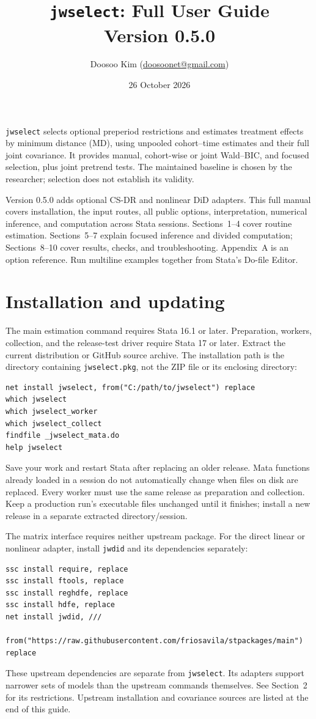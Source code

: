 \documentclass[11pt]{article}
\title{\texttt{jwselect}: Full User Guide\\\large Version 0.5.0}
\author{Doosoo Kim (\href{mailto:doosoonet@gmail.com}{doosoonet@gmail.com})}
\date{26 October 2026}
\newcommand{\cmd}[1]{\texttt{#1}}
\begin{document}
\maketitle\vspace{-1em}
\cmd{jwselect} selects optional preperiod restrictions and estimates treatment
 effects by minimum distance (MD), using unpooled cohort--time estimates and
 their full joint covariance. It provides manual, cohort-wise or joint Wald--BIC, and focused
 selection, plus joint pretrend tests. The maintained baseline is chosen by the researcher; selection
 does not establish its validity.

Version 0.5.0 adds optional CS-DR and nonlinear DiD adapters.
This full manual covers installation, the input routes, all public
 options, interpretation, numerical inference, and computation across Stata
 sessions. Sections~1--4 cover routine estimation. Sections~5--7 explain focused
 inference and divided computation; Sections~8--10 cover results, checks, and
 troubleshooting. Appendix~A is an option reference. Run multiline examples
 together from Stata's Do-file Editor.

\tableofcontents
\clearpage
\section{Installation and updating}
The main estimation command requires Stata 16.1 or later. Preparation,
workers, collection, and the release-test driver require Stata 17 or later.
Extract the current distribution or GitHub source archive. The installation
path is the directory containing \cmd{jwselect.pkg}, not the ZIP file
or its enclosing directory:
\begin{lstlisting}
net install jwselect, from("C:/path/to/jwselect") replace
which jwselect
which jwselect_worker
which jwselect_collect
findfile _jwselect_mata.do
help jwselect
\end{lstlisting}
Save your work and restart Stata after replacing an older release. Mata
functions already loaded in a session do not automatically change when files
on disk are replaced. Every worker must use the same release as preparation
and collection. Keep a production run's executable files unchanged until it
finishes; install a new release in a separate extracted directory/session.

The matrix interface requires neither upstream package. For the direct
linear or nonlinear adapter, install \cmd{jwdid} and its dependencies separately:
\begin{lstlisting}
ssc install require, replace
ssc install ftools, replace
ssc install reghdfe, replace
ssc install hdfe, replace
net install jwdid, ///
    from("https://raw.githubusercontent.com/friosavila/stpackages/main") replace
\end{lstlisting}
These upstream dependencies are separate from \cmd{jwselect}. Its adapters
support narrower sets of models than the upstream commands themselves.
See Section~2 for its restrictions. Upstream installation and covariance
sources are listed at the end of this guide.
\end{document}

